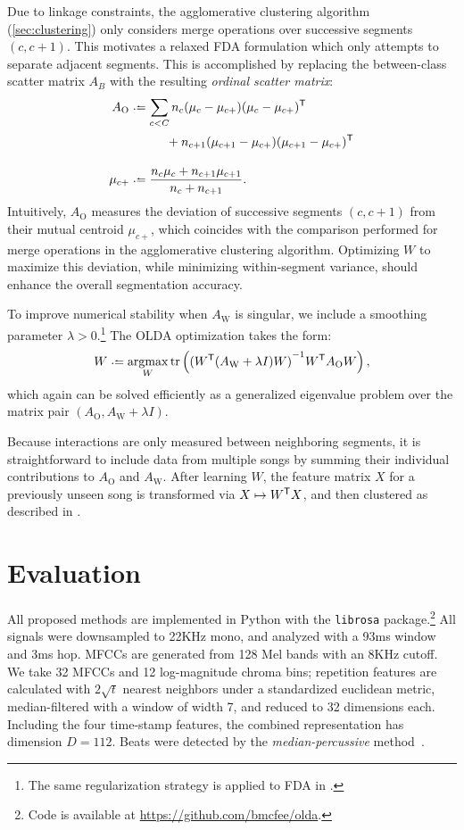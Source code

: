 \documentclass{article}
\begin{document}
Due to linkage constraints, the agglomerative clustering algorithm (\cref{sec:clustering}) only considers merge 
operations over successive segments $(c, c+1)$. This motivates a relaxed FDA formulation which only attempts to separate adjacent
segments.  This is accomplished by replacing the between-class scatter matrix $A_B$ with the resulting \emph{ordinal scatter matrix}:
\begin{align*}
A_\text{O} &\defeq \sum_{c < C} n_c (\mu_c - \mu_{c+}) (\mu_c - \mu_{c+})\trans\\
            &\phantom{\defeq \sum_{c < C}} + n_{c+1} (\mu_{c+1} - \mu_{c+}) (\mu_{c+1} - \mu_{c+})\trans\\
\mu_{c+} &\defeq \frac{n_c \mu_c + n_{c+1} \mu_{c+1} }{n_c + n_{c+1}}.
\end{align*}
Intuitively, $A_\text{O}$ measures the deviation of successive segments $(c, c+1)$ from their mutual centroid $\mu_{c+}$, 
which coincides with the comparison performed for merge operations in the agglomerative clustering algorithm.
Optimizing $W$ to maximize this deviation, while minimizing within-segment variance, should enhance the overall segmentation accuracy.  

To improve numerical stability when $A_\text{W}$ is singular, we include a smoothing parameter
$\lambda > 0$.\footnote{The same regularization strategy is applied to FDA in .} 
The OLDA optimization takes the form:
\begin{equation}
W \defeq \argmax_W \trace\left( {(W\trans (A_\text{W} + \lambda I) W)}^{-1} W\trans A_\text{O} W \right) \label{eq:olda},
\end{equation}
which again can be solved efficiently as a generalized eigenvalue problem over the matrix pair 
$(A_\text{O}, A_\text{W} + \lambda I)$.

Because interactions are only measured between neighboring segments, it is 
straightforward to include data from multiple songs by summing their individual contributions to $A_\text{O}$ and $A_\text{W}$.
After learning $W$, the feature matrix $X$ for a previously unseen song is transformed via $X \mapsto W^\mathsf{T} X$, and then 
clustered as described in .

\section{Evaluation}
\label{sec:eval}
All proposed methods are implemented in Python with the \texttt{librosa} package.\footnote{Code is
available at \url{https://github.com/bmcfee/olda}.}  
All signals were downsampled to 22KHz mono, and analyzed with a 93ms window and 3ms hop.  MFCCs are generated from 128 Mel bands
with an 8KHz cutoff. We take 32 MFCCs and 12 log-magnitude chroma bins; repetition features are calculated with $2\sqrt{t}$ nearest neighbors 
under a standardized euclidean metric, median-filtered with a window of width 7, and reduced to 32 dimensions each.  
Including the four time-stamp features, the combined representation has dimension $D=112$. Beats were detected by the \emph{median-percussive} method~\cite{mcfee2014beat}.
\end{document}
